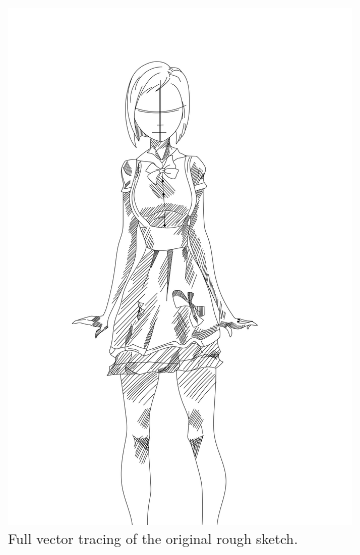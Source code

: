 \begin{figure}[h]
\begin{subfigure}{.3\textwidth}
        \includegraphics[width=\textwidth]{graphics/sketchbench/Art_freeform_AG_03_Branislav Mirkovic.pdf}
        \caption{Full vector tracing of the original rough sketch.}
    \end{subfigure}
    \hspace{.01\textwidth}
    \begin{subfigure}{.3\textwidth}

\end{subfigure}
\end{figure}
